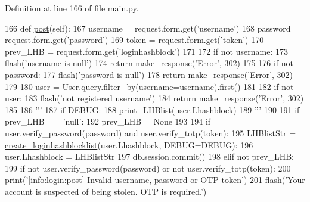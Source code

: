 Definition at line 166 of file main.\+py.


\begin{DoxyCode}
166     \textcolor{keyword}{def }\hyperlink{classmain_1_1login_a71ff3f89aaf0f0c8502577445ab38744}{post}(self):
167         username = request.form.get(\textcolor{stringliteral}{'username'})
168         password = request.form.get(\textcolor{stringliteral}{'password'})
169         token = request.form.get(\textcolor{stringliteral}{'token'})
170         prev\_LHB = request.form.get(\textcolor{stringliteral}{'loginhashblock'})
171 
172         \textcolor{keywordflow}{if} \textcolor{keywordflow}{not} username:
173             flash(\textcolor{stringliteral}{'username is null'})
174             \textcolor{keywordflow}{return} make\_response(\textcolor{stringliteral}{'Error'}, 302)
175 
176         \textcolor{keywordflow}{if} \textcolor{keywordflow}{not} password:
177             flash(\textcolor{stringliteral}{'password is null'})
178             \textcolor{keywordflow}{return} make\_response(\textcolor{stringliteral}{'Error'}, 302)
179 
180         user = User.query.filter\_by(username=username).first()
181 
182         \textcolor{keywordflow}{if} \textcolor{keywordflow}{not} user:
183             flash(\textcolor{stringliteral}{'not registered username'})
184             \textcolor{keywordflow}{return} make\_response(\textcolor{stringliteral}{'Error'}, 302)
185 
186         \textcolor{stringliteral}{'''}
187 \textcolor{stringliteral}{        if DEBUG:}
188 \textcolor{stringliteral}{            print\_LHBlist(user.Lhashblock)}
189 \textcolor{stringliteral}{        '''}
190 
191         \textcolor{keywordflow}{if} prev\_LHB == \textcolor{stringliteral}{'null'}:
192             prev\_LHB = \textcolor{keywordtype}{None}
193 
194         \textcolor{keywordflow}{if} user.verify\_password(password) \textcolor{keywordflow}{and} user.verify\_totp(token):
195             LHBlistStr = \hyperlink{namespaceloginhashblock_ab3608ba58ffedb0bd8bba86ce71fdefe}{create\_loginhashblocklist}(user.Lhashblock, DEBUG=DEBUG):
196             user.Lhashblock = LHBlistStr
197             db.session.commit()
198         \textcolor{keywordflow}{elif} \textcolor{keywordflow}{not} prev\_LHB:
199             \textcolor{keywordflow}{if} \textcolor{keywordflow}{not} user.verify\_password(password) \textcolor{keywordflow}{or} \textcolor{keywordflow}{not} user.verify\_totp(token):
200                 print(\textcolor{stringliteral}{'[info:login:post] Invalid username, password or OTP token'})
201                 flash(\textcolor{stringliteral}{'Your account is suspected of being stolen. OTP is required.'})

\end{DoxyCode}

